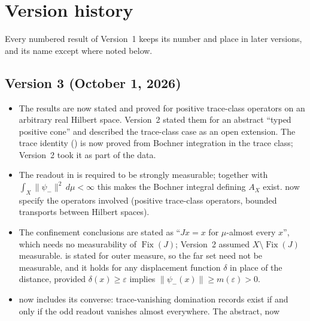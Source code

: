 \documentclass[11pt]{article}
\DeclareMathOperator{\Fix}{Fix}
\newcommand{\psim}{\psi_{-}}
\newcommand{\AX}{A_{X}}
\theoremstyle{definition}
\begin{document}
 \section{Version history}
\label{app:version-history}

Every numbered result of Version~1 keeps its number and place in later
versions, and its name except where noted below.

\subsection*{Version 3 (October 1, 2026)}

\begin{itemize}
  \item The results are now stated and proved for positive trace-class
    operators on an arbitrary real Hilbert space.  Version~2 stated
    them for an abstract ``typed positive cone'' and described the
    trace-class case as an open extension.  The trace identity
    () is now proved from
    Bochner integration in the trace class; Version~2 took it as part
    of the data.
  \item The readout in 
    is required to be strongly measurable; together with
    \(\int_X\|\psim\|^2\,d\mu<\infty\) this makes the Bochner integral
    defining \(\AX\) exist.
    now specify the operators involved (positive trace-class operators,
    bounded transports between Hilbert spaces).
  \item The confinement conclusions are stated as ``\(Jx=x\) for
    \(\mu\)-almost every \(x\)'', which needs no measurability of
    \(\Fix(J)\); Version~2 assumed \(X\setminus\Fix(J)\) measurable.
     is stated
    for outer measure, so the far set need not be measurable, and it
    holds for any displacement function \(\delta\) in place of the
    distance, provided \(\delta(x)\geq\varepsilon\) implies
    \(\|\psim(x)\|\geq m(\varepsilon)>0\).
  \item {} now includes its
    converse: trace-vanishing domination records exist if and only if
    the odd readout vanishes almost everywhere.  The abstract,
     now

\end{itemize}
\end{document}
